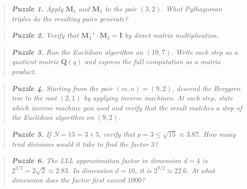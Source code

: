 \begin{quote}
\itshape
\textbf{Puzzle 1.} Apply $\mathbf{M}_1$ and $\mathbf{M}_3$ to the pair $(3, 2)$. What Pythagorean triples do the resulting pairs generate?
\end{quote}



\begin{quote}
\itshape
\textbf{Puzzle 2.} Verify that $\mathbf{M}_3^{-1} \cdot \mathbf{M}_3 = \mathbf{I}$ by direct matrix multiplication.
\end{quote}



\begin{quote}
\itshape
\textbf{Puzzle 3.} Run the Euclidean algorithm on $(19, 7)$. Write each step as a quotient matrix $\mathbf{Q}(q)$ and express the full computation as a matrix product.
\end{quote}



\begin{quote}
\itshape
\textbf{Puzzle 4.} Starting from the pair $(m, n) = (9, 2)$, descend the Berggren tree to the root $(2, 1)$ by applying inverse machines. At each step, state which inverse machine you used and verify that the result matches a step of the Euclidean algorithm on $(9, 2)$.
\end{quote}



\begin{quote}
\itshape
\textbf{Puzzle 5.} If $N = 15 = 3 \times 5$, verify that $p = 3 \le \sqrt{15} \approx 3.87$. How many trial divisions would it take to find the factor $3$?
\end{quote}



\begin{quote}
\itshape
\textbf{Puzzle 6.} The LLL approximation factor in dimension $d = 4$ is $2^{3/2} = 2\sqrt{2} \approx 2.83$. In dimension $d = 10$, it is $2^{9/2} \approx 22.6$. At what dimension does the factor first exceed $1000$?
\end{quote}

